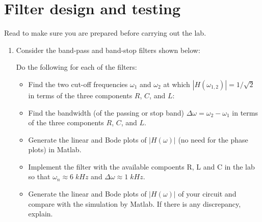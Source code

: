 
\usepackage{html}



\section*{Filter design and testing}

Read 
to make sure you are prepared before carrying out the lab.

\begin{enumerate}

\item Consider the band-pass and band-stop filters shown below:

  
  Do the following for each of the filters:
  \begin{itemize}
  \item Find the two cut-off frequencies $\omega_1$ and $\omega_2$ at which
    $|H(\omega_{1,2})|=1/\sqrt{2}$ in terms of the three components $R$, $C$, 
    and $L$:
  \item Find the bandwidth (of the passing or stop band)
    $\Delta\omega=\omega_2-\omega_1$ in terms of the three components $R$, 
    $C$, and $L$.
  \item Generate the linear and Bode plots of $|H(\omega)|$ (no need for the 
    phase plots) in Matlab.
  \item Implement the filter with the available compoents R, L and C in the 
    lab so that $\omega_n\approx 6\;kHz$ and $\Delta\omega\approx 1\;kHz$. 
  \item Generate the linear and Bode plots of $|H(\omega)|$ of your circuit
    and compare with the simulation by Matlab. If there is any discrepancy,
    explain.
  \end{itemize}

  \begin{comment}
  {\bf Solution:} 

  \begin{itemize}
  \item The FRF of the first circuit is
    \[
    H_{LC}=\frac{Z_{LC}}{Z_{LC}+R}=\frac{\frac{j\omega L}{1-(\omega/\omega_n)^2}}{
      \frac{j\omega L}{1-(\omega/\omega_n)^2 } +R}
    =\frac{j\omega L}{j\omega L+R(1-(\omega/\omega_n)^2)}
    =\frac{1}{1-j\frac{(1-(\omega/\omega_n)^2)}{\omega L/R}}
    \]
    When $\omega=\omega_n$, $Z_{LC}=\infty$, no current goes through $R$
    and the voltage across it is zero the output voltage is the same as the
    input voltage. Otherwise either $\omega>\omega_n$ or $\omega<\omega_n$,
    $Z_{LC}$ is finite, the voltage across $R$ is non-zero, the output voltage 
    is reduced. This is a band-pass filter:
    \[ 
    |H_{BP}|=\bigg|\frac{Z_C||Z_L}{R+Z_C||Z_L}\bigg|
    =\left\{\begin{array}{cc}0&\omega\rightarrow 0\\
    1&\omega=\omega_n\\ 0&\omega\rightarrow\infty\end{array}\right.
    \]


\end{comment}
\end{enumerate}
